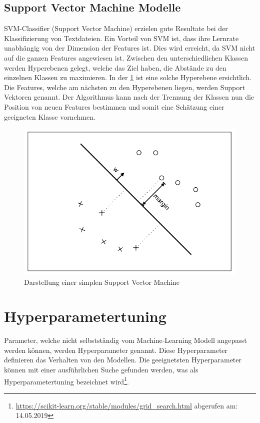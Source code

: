 \subsection{Support Vector Machine Modelle}
SVM-Classifier (Support Vector Machine) erzielen gute Resultate bei der Klassifizierung von Textdateien.
Ein Vorteil von SVM ist, dass ihre Lernrate unabhängig von der Dimension der Features ist. \cite{joachims1998text}
Dies wird erreicht, da SVM nicht auf die ganzen Features angewiesen ist.
Zwischen den unterschiedlichen Klassen werden Hyperebenen gelegt, welche das Ziel haben, die Abstände zu den einzelnen Klassen zu maximieren.
In der \cref{fig:svm} ist eine solche Hyperebene ersichtlich.
Die Features, welche am nächsten zu den Hyperebenen liegen, werden Support Vektoren genannt.
Der Algorithmus kann nach der Trennung der Klassen nun die Position von neuen Features bestimmen und somit eine Schätzung einer geeigneten Klasse vornehmen. \cite{tong2001support}
\begin{figure}[H]
	\centering	
	\includegraphics[width=0.7\columnwidth,keepaspectratio]{img/svm.png}
	\caption{Darstellung einer simplen Support Vector Machine}
	\label{fig:svm}
\end{figure}
\section{Hyperparametertuning}\label{sec:hyp}
Parameter, welche nicht selbstständig vom Machine-Learning Modell angepasst werden können, werden Hyperparameter genannt.
Diese Hyperparameter definieren das Verhalten von den Modellen.
Die geeignetsten Hyperparameter können mit einer ausführlichen Suche gefunden werden, was als Hyperparametertuning bezeichnet wird\footnote{\url{https://scikit-learn.org/stable/modules/grid_search.html} abgerufen am: 14.05.2019}. \cite{scikit-learn}